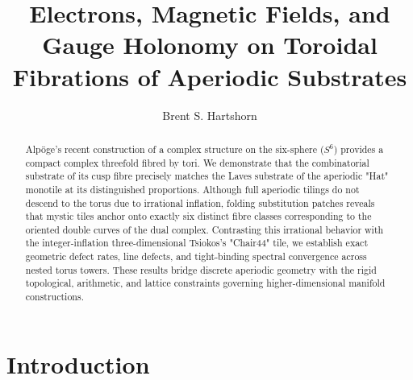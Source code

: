 \documentclass[11pt,a4paper]{article}
\title{Electrons, Magnetic Fields, and Gauge Holonomy on Toroidal Fibrations of Aperiodic Substrates}
\author{Brent S. Hartshorn \orcidlink{0009-0004-2853-655X}}
\theoremstyle{plain}
\theoremstyle{definition}
\begin{document}
\maketitle

\begin{abstract}
Alpöge's recent construction of a complex structure on the six-sphere ($S^{6}$) provides a compact complex threefold fibred by tori. We demonstrate that the combinatorial substrate of its cusp fibre precisely matches the Laves substrate of the aperiodic "Hat" monotile at its distinguished proportions. Although full aperiodic tilings do not descend to the torus due to irrational inflation, folding substitution patches reveals that mystic tiles anchor onto exactly six distinct fibre classes corresponding to the oriented double curves of the dual complex. Contrasting this irrational behavior with the integer-inflation three-dimensional Tsiokos's "Chair44" tile, we establish exact geometric defect rates, line defects, and tight-binding spectral convergence across nested torus towers. These results bridge discrete aperiodic geometry with the rigid topological, arithmetic, and lattice constraints governing higher-dimensional manifold constructions. 

\end{abstract}


\section{Introduction}
\label{sec:intro}
\end{document}
